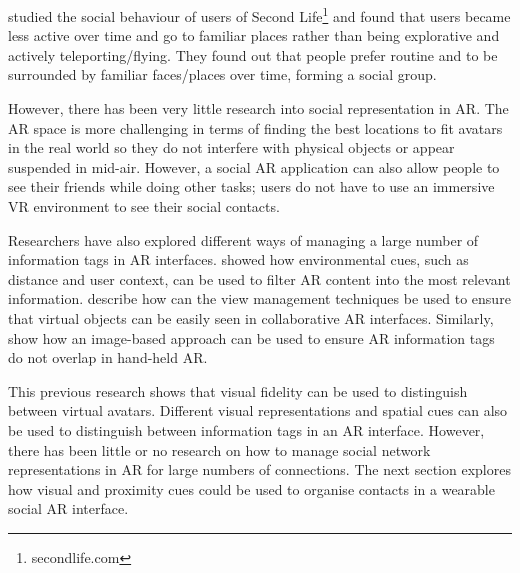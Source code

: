 \textcite{Harris2009} studied the social behaviour of users of Second Life\footnote{secondlife.com} and found that users became less active over time and go to familiar places rather than being explorative and actively teleporting/flying. They found out that people prefer routine and to be surrounded by familiar faces/places over time, forming a social group.

However, there has been very little research into social representation in AR. The AR space is more challenging in terms of finding the best locations to fit avatars in the real world so they do not interfere with physical objects or appear suspended in mid-air. However, a social AR application can also allow people to see their friends while doing other tasks; users do not have to use an immersive VR environment to see their social contacts.

Researchers have also explored different ways of managing a large number of information tags in AR interfaces. \textcite{Julier2002} showed how environmental cues, such as distance and user context, can be used to filter AR content into the most relevant information. \textcite{Hollerer2001} describe how can the view management techniques be used to ensure that virtual objects can be easily seen in collaborative AR interfaces. Similarly, \textcite{Grasset2012} show how an image-based approach can be used to ensure AR information tags do not overlap in hand-held AR. 

This previous research shows that visual fidelity can be used to distinguish between virtual avatars. Different visual representations and spatial cues can also be used to distinguish between information tags in an AR interface. However, there has been little or no research on how to manage social network representations in AR for large numbers of connections. The next section explores how visual and proximity cues could be used to organise contacts in a wearable social AR interface.



